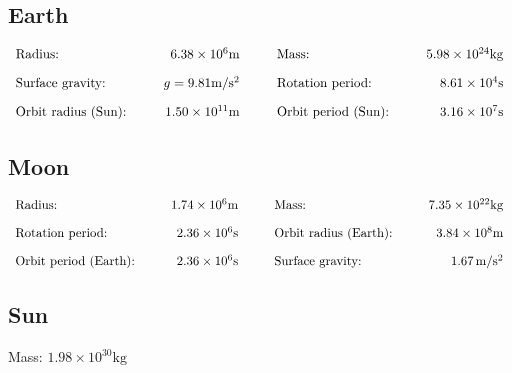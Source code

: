 \documentclass[12pt,a4paper]{article}
\begin{document}
\subsection{Earth}
\begin{align*}
  \begin{array}{l@{\hspace{1cm}}r@{\hspace{1cm}}l@{\hspace{1cm}}r}
    \text{Radius:} & 6.38 \times 10^6 \mathrm{m} & \text{Mass:} & 5.98 \times 10^{24} \mathrm{kg} \\[1em]
    \text{Surface gravity:} & g=9.81 \mathrm{m}/\mathrm{s}^2 & \text{Rotation period:} & 8.61 \times 10^4 \mathrm{s} \\[1em]
    \text{Orbit radius (Sun):} & 1.50 \times 10^{11} \mathrm{m} & \text{Orbit period (Sun):} & 3.16 \times 10^7 \mathrm{s}
  \end{array}
\end{align*}

\subsection{Moon}
\begin{align*}
  \begin{array}{l@{\hspace{1cm}}r@{\hspace{1cm}}l@{\hspace{1cm}}r}
    \text{Radius:} & 1.74 \times 10^6 \mathrm{m} & \text{Mass:} & 7.35 \times 10^{22} \mathrm{kg} \\[1em]
    \text{Rotation period:} & 2.36 \times 10^6 \mathrm{s} & \text{Orbit radius (Earth):} & 3.84 \times 10^8 \mathrm{m} \\[1em]
    \text{Orbit period (Earth):} & 2.36 \times 10^6 \mathrm{s} & \text{Surface gravity:} & 1.67 \, \mathrm{m/s^2}
\end{array}
\end{align*}

\subsection{Sun}
Mass: $1.98 \times 10^{30} \mathrm{kg}$
\end{document}
